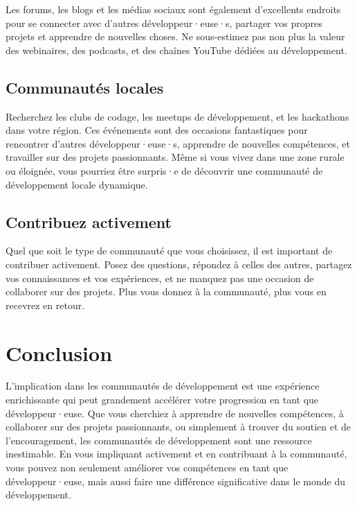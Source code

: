 Les forums, les blogs et les médias sociaux sont également d'excellents endroits pour se connecter avec d'autres développeur·euse·s, partager vos propres projets et apprendre de nouvelles choses. Ne sous-estimez pas non plus la valeur des webinaires, des podcasts, et des chaînes YouTube dédiées au développement.

\subsection{Communautés locales}

Recherchez les clubs de codage, les meetups de développement, et les hackathons dans votre région. Ces événements sont des occasions fantastiques pour rencontrer d'autres développeur·euse·s, apprendre de nouvelles compétences, et travailler sur des projets passionnants. Même si vous vivez dans une zone rurale ou éloignée, vous pourriez être surpris·e de découvrir une communauté de développement locale dynamique.

\subsection{Contribuez activement}

Quel que soit le type de communauté que vous choisissez, il est important de contribuer activement. Posez des questions, répondez à celles des autres, partagez vos connaissances et vos expériences, et ne manquez pas une occasion de collaborer sur des projets. Plus vous donnez à la communauté, plus vous en recevrez en retour.

\section{Conclusion}

L'implication dans les communautés de développement est une expérience enrichissante qui peut grandement accélérer votre progression en tant que développeur·euse. Que vous cherchiez à apprendre de nouvelles compétences, à collaborer sur des projets passionnants, ou simplement à trouver du soutien et de l'encouragement, les communautés de développement sont une ressource inestimable. En vous impliquant activement et en contribuant à la communauté, vous pouvez non seulement améliorer vos compétences en tant que développeur·euse, mais aussi faire une différence significative dans le monde du développement.

